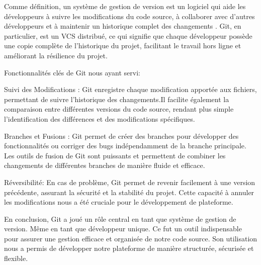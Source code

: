 Comme définition, un système de gestion de version est un logiciel qui aide les développeurs à suivre les modifications du code source, à collaborer avec d'autres développeurs et à maintenir un historique complet des changements \cite{zolkifli2018version}. Git, en particulier, est un VCS distribué, ce qui signifie que chaque développeur possède une copie complète de l'historique du projet, facilitant le travail hors ligne et améliorant la résilience du projet.


Fonctionnalités clés de Git nous ayant servi: \\
\par 
Suivi des Modifications : Git enregistre chaque modification apportée aux fichiers, permettant de suivre l'historique des changements.Il facilite également la comparaison entre différentes versions du code source, rendant plus simple l'identification des différences et des modifications spécifiques.
\par 
Branches et Fusions : Git permet de créer des branches pour développer des fonctionnalités ou corriger des bugs indépendamment de la branche principale. 
Les outils de fusion de Git sont puissants et permettent de combiner les changements de différentes branches de manière fluide et efficace.
\par 
Réversibilité: En cas de problème, Git permet de revenir facilement à une version précédente, assurant la sécurité et la stabilité du projet.
Cette capacité à annuler les modifications nous a été cruciale pour le développement de plateforme.
\par 
En conclusion, Git a joué un rôle central en tant que système de gestion de version. Même en tant que développeur unique. Ce fut un outil indispensable pour assurer une gestion efficace et organisée de notre code source. Son utilisation nous a permis de développer notre plateforme de manière structurée, sécurisée et flexible.

